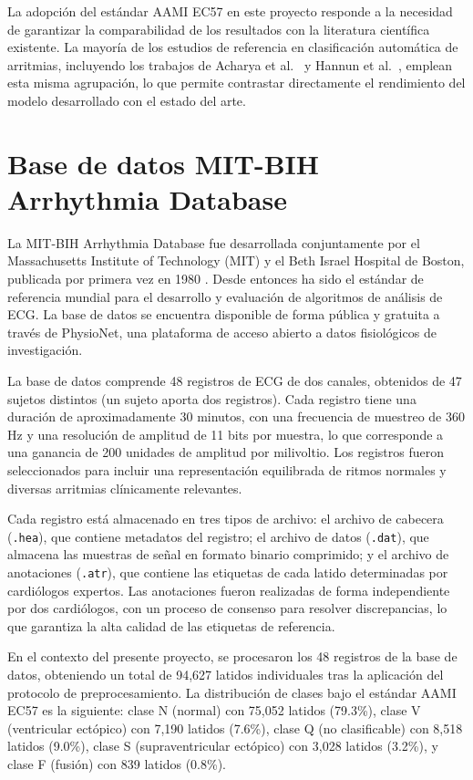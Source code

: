 La adopción del estándar AAMI EC57 en este proyecto responde a la necesidad de garantizar la comparabilidad de los resultados con la literatura científica existente. La mayoría de los estudios de referencia en clasificación automática de arritmias, incluyendo los trabajos de Acharya et al.\ \cite{Acharya2017} y Hannun et al.\ \cite{Hannun2019}, emplean esta misma agrupación, lo que permite contrastar directamente el rendimiento del modelo desarrollado con el estado del arte.

\section{Base de datos MIT-BIH Arrhythmia Database}

La MIT-BIH Arrhythmia Database fue desarrollada conjuntamente por el Massachusetts Institute of Technology (MIT) y el Beth Israel Hospital de Boston, publicada por primera vez en 1980 \cite{Moody2001}. Desde entonces ha sido el estándar de referencia mundial para el desarrollo y evaluación de algoritmos de análisis de ECG. La base de datos se encuentra disponible de forma pública y gratuita a través de PhysioNet, una plataforma de acceso abierto a datos fisiológicos de investigación.

La base de datos comprende 48 registros de ECG de dos canales, obtenidos de 47 sujetos distintos (un sujeto aporta dos registros). Cada registro tiene una duración de aproximadamente 30 minutos, con una frecuencia de muestreo de 360 Hz y una resolución de amplitud de 11 bits por muestra, lo que corresponde a una ganancia de 200 unidades de amplitud por milivoltio. Los registros fueron seleccionados para incluir una representación equilibrada de ritmos normales y diversas arritmias clínicamente relevantes.

Cada registro está almacenado en tres tipos de archivo: el archivo de cabecera (\texttt{.hea}), que contiene metadatos del registro; el archivo de datos (\texttt{.dat}), que almacena las muestras de señal en formato binario comprimido; y el archivo de anotaciones (\texttt{.atr}), que contiene las etiquetas de cada latido determinadas por cardiólogos expertos. Las anotaciones fueron realizadas de forma independiente por dos cardiólogos, con un proceso de consenso para resolver discrepancias, lo que garantiza la alta calidad de las etiquetas de referencia.

En el contexto del presente proyecto, se procesaron los 48 registros de la base de datos, obteniendo un total de 94,627 latidos individuales tras la aplicación del protocolo de preprocesamiento. La distribución de clases bajo el estándar AAMI EC57 es la siguiente: clase N (normal) con 75,052 latidos (79.3\%), clase V (ventricular ectópico) con 7,190 latidos (7.6\%), clase Q (no clasificable) con 8,518 latidos (9.0\%), clase S (supraventricular ectópico) con 3,028 latidos (3.2\%), y clase F (fusión) con 839 latidos (0.8\%).

